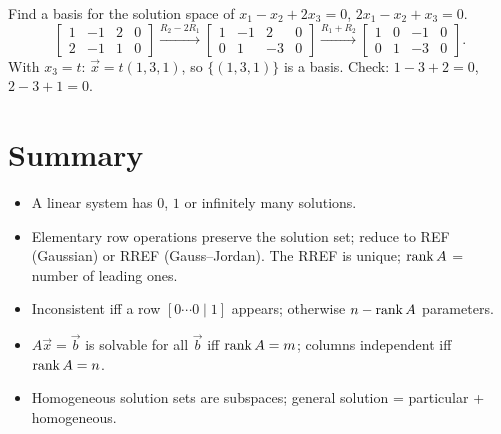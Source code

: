 \begin{example}
Find a basis for the solution space of $x_1-x_2+2x_3=0$, $2x_1-x_2+x_3=0$.
\[
\left[\begin{array}{ccc|c} 1&-1&2&0\\ 2&-1&1&0\end{array}\right]
\xrightarrow{R_2-2R_1}
\left[\begin{array}{ccc|c} 1&-1&2&0\\ 0&1&-3&0\end{array}\right]
\xrightarrow{R_1+R_2}
\left[\begin{array}{ccc|c} 1&0&-1&0\\ 0&1&-3&0\end{array}\right].
\]
With $x_3=t$: $\vec x = t(1,3,1)$, so $\{(1,3,1)\}$ is a basis. Check: $1-3+2=0$, $2-3+1=0$.
\end{example}

\section*{Summary}
\begin{itemize}
  \item A linear system has $0$, $1$ or infinitely many solutions.
  \item Elementary row operations preserve the solution set; reduce to REF (Gaussian) or RREF
        (Gauss--Jordan). The RREF is unique; $\operatorname{rank} A$ = number of leading ones.
  \item Inconsistent iff a row $[0\cdots0\mid1]$ appears; otherwise $n-\operatorname{rank} A$ parameters.
  \item $A\vec x=\vec b$ is solvable for all $\vec b$ iff $\operatorname{rank} A=m$; columns independent iff
        $\operatorname{rank} A = n$.
  \item Homogeneous solution sets are subspaces; general solution = particular + homogeneous.
\end{itemize}
